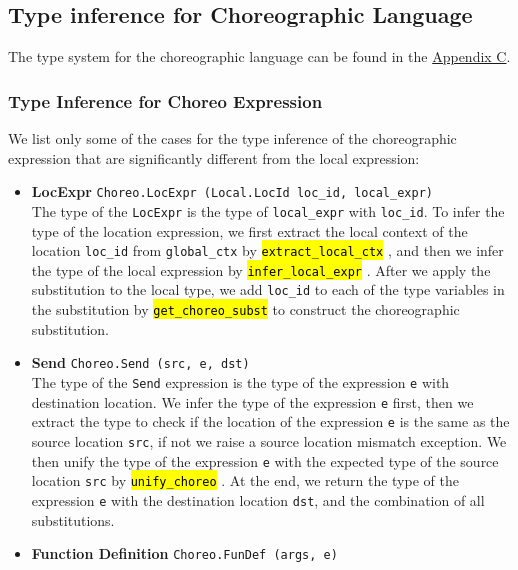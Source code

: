 \documentclass{article}
\newcommand{\highlighttexttt}[2][black]{ %
  \sethlcolor{cyan!10} %
  \texttt{\textcolor{#1}{\hl{#2}}}
}
\begin{document}
\subsection{Type inference for Choreographic Language}
    The type system for the choreographic language can be found in the \hyperref[appendix:choreo_typ]{Appendix C}.

    \subsubsection{Type Inference for Choreo Expression}\label{choreo_expr}
        We list only some of the cases for the type inference of the choreographic expression that are
        significantly different from the local expression:
        \begin{itemize}
            \item \textbf{LocExpr} \texttt{Choreo.LocExpr (Local.LocId loc\_id, local\_expr)}\\
                  The type of the \texttt{LocExpr} is the type of \texttt{local\_expr} with \texttt{loc\_id}.
                  To infer the type of the location expression, we first extract the local context of the location \texttt{loc\_id} from \texttt{global\_ctx}
                  by \highlighttexttt{extract\_local\_ctx}, and then we infer the type of the local expression by \highlighttexttt{infer\_local\_expr}.
                  After we apply the substitution to the local type, we add \texttt{loc\_id} to each of the type variables in the substitution by
                  \highlighttexttt{get\_choreo\_subst} to construct the choreographic substitution.
            \item \textbf{Send} \texttt{Choreo.Send (src, e, dst)}\\
                  The type of the \texttt{Send} expression is the type of the expression \texttt{e} with destination location.
                  We infer the type of the expression \texttt{e} first, then we extract the type to check if the location of the expression \texttt{e}
                  is the same as the source location \texttt{src}, if not we raise a source location mismatch exception.
                  We then unify the type of the expression \texttt{e} with the expected type of the source location \texttt{src} by \highlighttexttt{unify\_choreo}.
                  At the end, we return the type of the expression \texttt{e} with the destination location \texttt{dst}, and the combination of all substitutions.
            \item \textbf{Function Definition} \texttt{Choreo.FunDef (args, e)}\\

\end{itemize}
\end{document}
